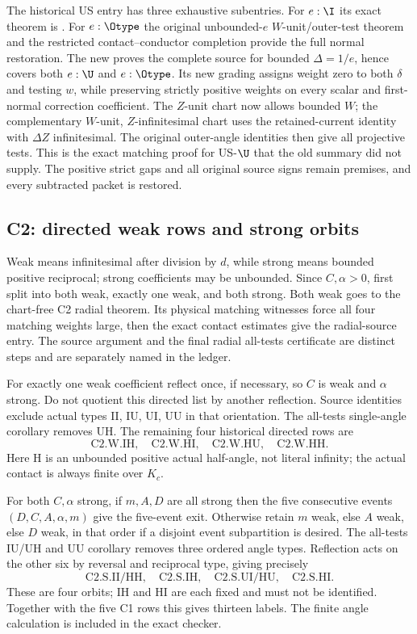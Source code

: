 The historical US entry has three exhaustive subentries. For $e:\I$
its exact theorem is . For $e:\Otype$
the original unbounded-$e$ $W$-unit/outer-test theorem and the restricted
contact--conductor completion provide the full normal restoration.
The new  proves the complete
source for bounded $\Delta=1/e$, hence covers both $e:\U$ and
$e:\Otype$. Its new grading assigns weight zero to both $\delta$
and testing $w$, while preserving strictly positive weights on every
scalar and first-normal correction coefficient. The $Z$-unit chart now
allows bounded $W$; the complementary $W$-unit, $Z$-infinitesimal chart
uses the retained-current identity with $\Delta Z$ infinitesimal.
The original outer-angle identities then give all projective tests.
This is the exact matching proof for US-$\U$ that the old summary
did not supply. The positive strict gaps and all original source signs
remain premises, and every subtracted packet is restored.

\subsection{C2: directed weak rows and strong orbits}

Weak means infinitesimal after division by $d$, while strong means
bounded positive reciprocal; strong coefficients may be unbounded.
Since $C,\alpha>0$, first split into both weak, exactly one weak, and
both strong. Both weak goes to the chart-free C2 radial theorem. Its
physical matching witnesses force all four matching weights large,
then the exact contact estimates give the radial-source entry. The
source argument and the final radial all-tests certificate are distinct
steps and are separately named in the ledger.

For exactly one weak coefficient reflect once, if necessary, so $C$
is weak and $\alpha$ strong. Do not quotient this directed list by
another reflection. Source identities exclude actual types II, IU, UI,
UU in that orientation. The all-tests single-angle corollary removes
UH. The remaining four historical directed rows are
\[
\mathrm{C2.W.IH},\quad\mathrm{C2.W.HI},\quad
\mathrm{C2.W.HU},\quad\mathrm{C2.W.HH}.
\]
Here H is an unbounded positive actual half-angle, not literal infinity;
the actual contact is always finite over $K_c$.

For both $C,\alpha$ strong, if $m,A,D$ are all strong then the five
consecutive events $(D,C,A,\alpha,m)$ give the five-event exit.
Otherwise retain $m$ weak, else $A$ weak, else $D$ weak, in that order
if a disjoint event subpartition is desired. The all-tests IU/UH and
UU corollary removes three ordered angle types. Reflection acts on
the other six by reversal and reciprocal type, giving precisely
\[
\mathrm{C2.S.II/HH},\quad\mathrm{C2.S.IH},\quad
\mathrm{C2.S.UI/HU},\quad\mathrm{C2.S.HI}.
\]
These are four orbits; IH and HI are each fixed and must not be
identified. Together with the five C1 rows this gives thirteen labels.
The finite angle calculation is included in the exact checker.

